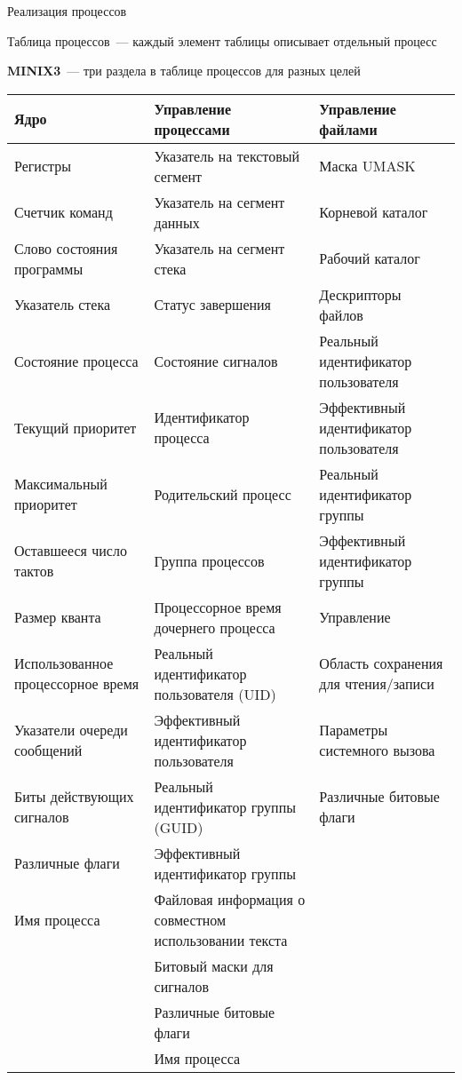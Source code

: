 \documentclass[aspectratio=169,14pt]{beamer}
\begin{document}
\begin{frame}{Реализация процессов}
    \begin{itemize}
        \begin{footnotesize}
            \item Таблица процессов~--- каждый элемент таблицы описывает
            отдельный процесс
            \item \textbf{MINIX3}~--- три раздела в таблице процессов для
            разных целей
        \end{footnotesize}
    \end{itemize}
    \begin{tiny}
        \begin{tabular}{p{3.6cm}p{4.4cm}p{4.4cm}}
            \hline
            \textbf{Ядро} & \textbf{Управление процессами} & \textbf{Управление файлами} \\ \hline
            Регистры & Указатель на текстовый сегмент & Маска UMASK \\
            Счетчик команд & Указатель на сегмент данных & Корневой каталог \\
            Слово состояния программы & Указатель на сегмент стека &  Рабочий каталог \\
            Указатель стека &  Статус завершения &  Дескрипторы файлов \\
            Состояние процесса & Состояние сигналов & Реальный идентификатор пользователя\\
            Текущий приоритет &  Идентификатор процесса & Эффективный идентификатор пользователя \\
            Максимальный приоритет &  Родительский процесс & Реальный идентификатор группы \\
            Оставшееся число тактов &  Группа процессов & Эффективный идентификатор группы \\
            Размер кванта &  Процессорное время дочернего процесса & Управление \\
            Использованное процессорное время & Реальный идентификатор пользователя (UID) & Область сохранения для чтения/записи \\
            Указатели очереди сообщений & Эффективный идентификатор пользователя & Параметры системного вызова \\
            Биты действующих сигналов &  Реальный идентификатор группы (GUID) & Различные битовые флаги \\
            Различные флаги & Эффективный идентификатор группы &  \\
            Имя процесса & Файловая информация о совместном использовании текста &  \\
            & Битовый маски для сигналов &  \\
            & Различные битовые флаги &  \\
            & Имя процесса &  \\
        \end{tabular}
    \end{tiny}
\end{frame}
\end{document}
